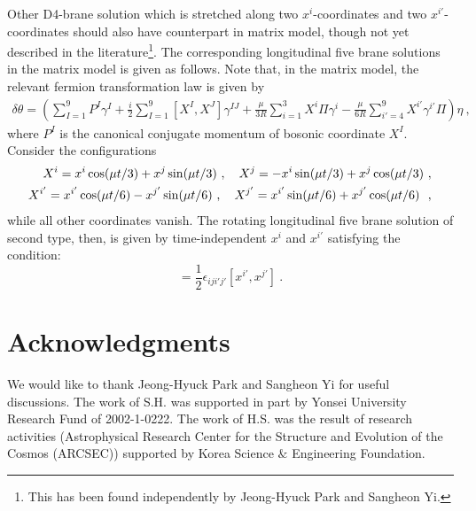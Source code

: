 \documentclass[a4paper,12pt]{article}
\begin{document}
Other D4-brane solution which is stretched along two $x^i$-coordinates
and two $x^{i'}$-coordinates should also have counterpart 
in matrix model, though
not yet described in the literature\footnote{
This has been found independently by Jeong-Hyuck
Park and Sangheon Yi.}. The corresponding longitudinal five brane solutions 
in the matrix model is given as follows. Note that, in the matrix model, 
the relevant fermion transformation law is given by 
\begin{eqnarray}
\delta \theta  =
  \left(
    \sum_{I=1}^9  P^I \gamma^I
  + \frac{i}{2} \sum_{I=1}^9 [X^I, X^J] \gamma^{IJ}
  + \frac{\mu}{3R} \sum_{i=1}^3 X^i \Pi \gamma^i
  - \frac{\mu}{6R} \sum_{i'=4}^9 X^{i'} \gamma^{i'}\Pi
  \right) \eta~,
  \label{dyn}
\end{eqnarray}
where $P^I$ is the canonical conjugate momentum of bosonic coordinate $X^I$.
Consider the configurations
\begin{eqnarray}
X^{i}=x^i \cos(\mu t/3) + x^j \sin(\mu t/3) ~, \ \ \
X^{j}=-x^i\sin(\mu t/3) + x^j \cos(\mu t/3)~,\cr 
X^{i'}=x^{i'} \cos(\mu t/6) - x^{j'}\sin(\mu t/6) ~, \ \ \ 
X^{j'}=x^{i'} \sin(\mu t/6) + x^{j'}\cos(\mu t/6)~~,
\label{conf2}
\end{eqnarray}
while all other coordinates vanish. The rotating longitudinal five brane 
solution of second type, then, is given 
by time-independent $x^{i}$ and  $x^{i'}$ satisfying
the condition:
\begin{equation}
[x^{i}, x^{j} ] = \frac{1}{2}\epsilon_{ij i'j'}[x^{i'},
x^{j'}]~. \label{lc}
\end{equation}




\section*{Acknowledgments}
We would like to thank Jeong-Hyuck Park and Sangheon Yi for useful
discussions.  The work of S.H. was supported in part by Yonsei
University Research Fund of 2002-1-0222.  The work of H.S. was the
result of research activities (Astrophysical Research Center for the
Structure and Evolution of the Cosmos (ARCSEC)) supported by Korea
Science $\&$ Engineering Foundation.
\end{document}
